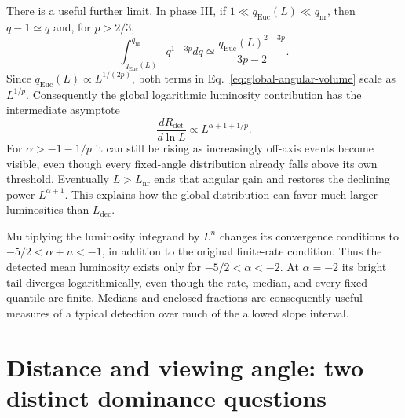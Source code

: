 \documentclass[11pt,a4paper]{article}
\newcommand{\Euc}{\mathrm{Euc}}
\newcommand{\nr}{\mathrm{nr}}
\newcommand{\Ldec}{L_{\mathrm{dec}}}
\newcommand{\Lnr}{L_{\mathrm{nr}}}
\newcommand{\Rdet}{R_{\mathrm{det}}}
\begin{document}
There is a useful further limit. In phase III, if
$1\ll q_\Euc(L)\ll q_\nr$, then $q-1\simeq q$ and, for $p>2/3$,
\begin{equation}
 \int_{q_\Euc(L)}^{q_\nr}q^{1-3p}dq
 \simeq\frac{q_\Euc(L)^{2-3p}}{3p-2}.
\end{equation}
Since $q_\Euc(L)\propto L^{1/(2p)}$, both terms in
Eq.~\eqref{eq:global-angular-volume} scale as $L^{1/p}$.
Consequently the global logarithmic luminosity contribution has the
intermediate asymptote
\begin{equation}
 \frac{d\Rdet}{d\ln L}\propto L^{\alpha+1+1/p}.
 \label{eq:global-intermediate}
\end{equation}
For $\alpha>-1-1/p$ it can still be rising as increasingly off-axis events
become visible, even though every fixed-angle distribution already falls
above its own threshold. Eventually $L>\Lnr$ ends that angular gain and
restores the declining power $L^{\alpha+1}$. This explains how the global
distribution can favor much larger luminosities than $\Ldec$.


Multiplying the luminosity integrand by $L^n$ changes its convergence
conditions to $-5/2<\alpha+n<-1$, in addition to the original finite-rate
condition. Thus the detected mean luminosity exists only for
$-5/2<\alpha<-2$. At $\alpha=-2$ its bright tail diverges logarithmically,
even though the rate, median, and every fixed quantile are finite. Medians
and enclosed fractions are consequently useful measures of a typical
detection over much of the allowed slope interval.

\section{Distance and viewing angle: two distinct dominance questions}
\label{sec:distance-angle}
\end{document}
